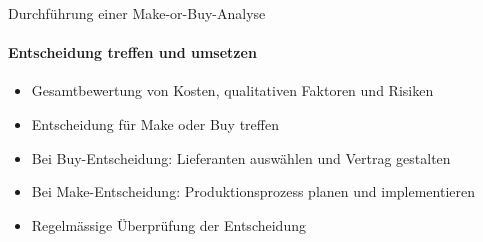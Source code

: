 \begin{KR}{Durchführung einer Make-or-Buy-Analyse}
\paragraph{Entscheidung treffen und umsetzen}
\begin{itemize}
    \item Gesamtbewertung von Kosten, qualitativen Faktoren und Risiken
    \item Entscheidung für Make oder Buy treffen
    \item Bei Buy-Entscheidung: Lieferanten auswählen und Vertrag gestalten
    \item Bei Make-Entscheidung: Produktionsprozess planen und implementieren
    \item Regelmässige Überprüfung der Entscheidung
\end{itemize}
\end{KR}

